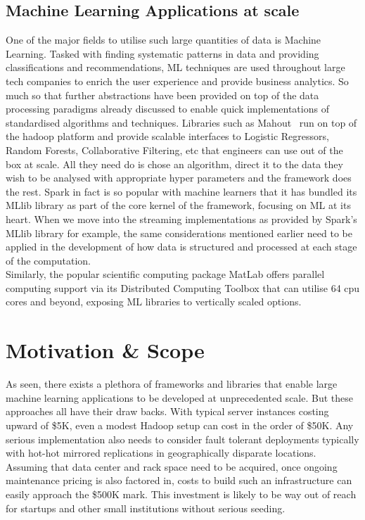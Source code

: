 \documentclass[a4paper,11pt]{scrreprt}
\begin{document}
\section{Machine Learning Applications at scale}
One of the major fields to utilise such large quantities of data is Machine Learning. Tasked with finding systematic patterns in data and providing classifications and recommendations, ML techniques are used throughout large tech companies to enrich the user experience and provide business analytics. So much so that further abstractions have been provided on top of the data processing paradigms already discussed to enable quick implementations of standardised algorithms and techniques. Libraries such as Mahout~\cite{mahout-site} run on top of the hadoop platform and provide scalable interfaces to Logistic Regressors, Random Forests, Collaborative Filtering, etc that engineers can use out of the box at scale. All they need do is chose an algorithm, direct it to the data they wish to be analysed with appropriate hyper parameters and the framework does the rest. Spark in fact is so popular with machine learners that it has bundled its MLlib library as part of the core kernel of the framework, focusing on ML at its heart. When we move into the streaming implementations as provided by Spark's MLlib library for example, the same considerations mentioned earlier need to be applied in the development of how data is structured and processed at each stage of the computation.\\

Similarly, the popular scientific computing package MatLab offers parallel computing support via its Distributed Computing Toolbox that can utilise 64 \acrshort{cpu} cores and beyond, exposing ML libraries to vertically scaled options.

\chapter{Motivation \& Scope}
As seen, there exists a plethora of frameworks and libraries that enable large machine learning applications to be developed at unprecedented scale. But these approaches all have their draw backs. With typical server instances costing upward of \$5K, even a modest Hadoop setup can cost in the order of \$50K. Any serious implementation also needs to consider fault tolerant deployments typically with hot-hot mirrored replications in geographically disparate locations. Assuming that data center and rack space need to be acquired, once ongoing maintenance pricing is also factored in, costs to build such an infrastructure can easily approach the \$500K mark. This investment is likely to be way out of reach for startups and other small institutions without serious seeding.
\end{document}
